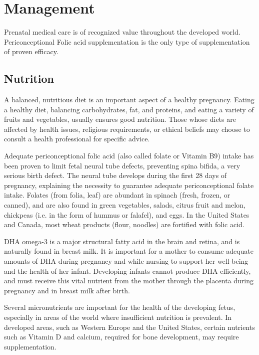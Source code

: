 \documentclass[12pt,a4paper,onecolumn]{article}
\begin{document}
\section{Management}

Prenatal medical care is of recognized value throughout the developed world. Periconceptional Folic
acid supplementation is the only type of supplementation of proven efficacy.

\subsection{Nutrition}

A balanced, nutritious diet is an important aspect of a healthy pregnancy. Eating a healthy diet,
balancing carbohydrates, fat, and proteins, and eating a variety of fruits and vegetables, usually
ensures good nutrition. Those whose diets are affected by health issues, religious requirements, or
ethical beliefs may choose to consult a health professional for specific advice.

Adequate periconceptional folic acid (also called folate or Vitamin B9) intake has been proven to
limit fetal neural tube defects, preventing spina bifida, a very serious birth defect. The neural
tube develops during the first 28 days of pregnancy, explaining the necessity to guarantee adequate
periconceptional folate intake. Folates (from folia, leaf) are abundant in spinach (fresh, frozen,
or canned), and are also found in green vegetables, salads, citrus fruit and melon, chickpeas (i.e.
in the form of hummus or falafel), and eggs. In the United States and Canada, most wheat products
(flour, noodles) are fortified with folic acid.

DHA omega-3 is a major structural fatty acid in the brain and retina, and is naturally found in
breast milk. It is important for a mother to consume adequate amounts of DHA during pregnancy and
while nursing to support her well-being and the health of her infant. Developing infants cannot
produce DHA efficiently, and must receive this vital nutrient from the mother through the placenta
during pregnancy and in breast milk after birth.

Several micronutrients are important for the health of the developing fetus, especially in areas of
the world where insufficient nutrition is prevalent. In developed areas, such as Western Europe and
the United States, certain nutrients such as Vitamin D and calcium, required for bone development,
may require supplementation.
\end{document}
